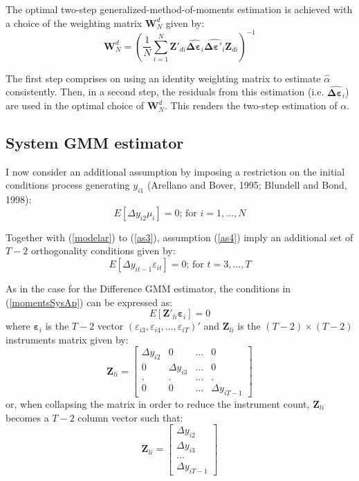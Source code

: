 \documentclass[a4paper, 12pt]{article}
\begin{document}
The optimal two-step generalized-method-of-moments estimation is achieved with a choice of the weighting matrix $\mathbf{W}_{N}^d$ given by:
\[
\mathbf{W}_{N}^d=\left( \frac{1}{N} \sum\limits_{i=1}^{N} \mathbf{Z}'_{di} \hat{ \mathbf{\Delta \varepsilon}_i} \hat{ \mathbf{\Delta \varepsilon}'_i} \mathbf{Z}_{di} \right)^{-1}
\]

The first step comprises on using an identity weighting matrix to estimate $\hat \alpha$ consistently. Then, in a second step, the residuals from this estimation (i.e. $\hat{\mathbf{\Delta \varepsilon}_i}$) are used in the optimal choice of $\mathbf{W}_{N}^d$. This renders the two-step estimation of $ \alpha$.

\subsection*{System GMM estimator}

I now consider an additional assumption by imposing a restriction on the initial conditions process generating $y_{i1}$ (Arellano and Bover, 1995; Blundell and Bond, 1998):
\begin{equation}
\label{as4}
\tag{6'}
E\left[\Delta y_{i2}\mu_{i}\right]=0\text{; for $i=1,...,N$}
\end{equation}

Together with (\ref{modelar}) to (\ref{as3}), assumption (\ref{as4}) imply an additional set of $T-2$ orthogonality conditions given by:
\begin{equation}
\label{momentsSysAp}
\tag{7'}
E\left[\Delta y_{it-1} \varepsilon_{it}\right]=0 \text{; for $t=3,...,T$}
\end{equation}

As in the case for the Difference GMM estimator, the conditions in (\ref{momentsSysAp}) can be expressed as:
\begin{equation*}
E\left[ \mathbf{Z}'_{li}\mathbf{ \varepsilon}_{i}\right]=0
\end{equation*}
where $\mathbf{\varepsilon}_{i}$ is the $T-2$ vector $( \varepsilon_{i3}, \varepsilon_{i4},..., \varepsilon_{iT})'$ and $\mathbf{Z}_{li}$ is the $(T-2)\times (T-2)$ instruments matrix given by:
\[
\mathbf{Z}_{li} = 
\left[ {\begin{array}{*{20}{c}}
{\Delta {y_{i2}}}&0&{...}&0\\
0&{\Delta {y_{i3}}}&{...}&0\\
.&.&{...}&.\\
0&0&{...}&{\Delta {y_{iT - 1}}}
\end{array}} \right]
\]
or, when collapsing the matrix in order to reduce the instrument count, $\mathbf{Z}_{li}$ becomes a $T-2$ column vector such that:
\[
\mathbf{Z}_{li} = 
\left[ {\begin{array}{*{20}{c}}
{\Delta {y_{i2}}}\\
{\Delta {y_{i3}}}\\
{...}\\
{\Delta {y_{iT - 1}}}
\end{array}} \right]
\]
\end{document}
